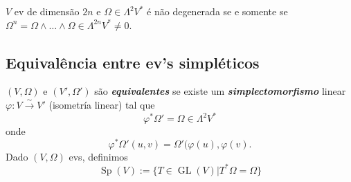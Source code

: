 \begin{exercise}
	$V$ ev de dimens\~ao $2n$ e $\Omega\in \Lambda^{2} V^{*}$ \'e n\~ao degenerada se e somente se $\Omega^{n}=\Omega\wedge \ldots\wedge \Omega\in \Lambda^{2n} V^{*} \neq 0$.
\end{exercise}

\subsection{Equival\^encia entre ev's simpl\'eticos}

$(V,\Omega)$ e $(V',\Omega')$ s\~ao \textit{\textbf{equivalentes}} se existe um \textit{\textbf{simplectomorfismo}} linear $\varphi :V\overset{\sim}{\to }V'$ (isometr\'ia linear) tal que
	\[\varphi^{*}\Omega'=\Omega\in \Lambda^{2} V^{*}\] 
onde
\[\varphi^{*} \Omega'(u,v)=\Omega'(\varphi(u),\varphi(v).\]
Dado $(V,\Omega)$ evs, definimos
\[\operatorname{Sp}(V):=\{T\in \operatorname{GL}(V)|T^{*} \Omega=\Omega\} \]
